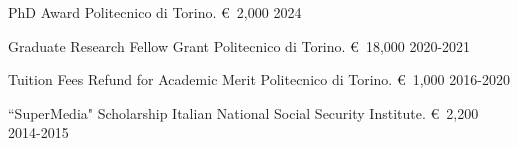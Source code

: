 
\begin{cvhonors}
  \cvhonor
    {PhD Award} %
    {Politecnico di Torino.} %
    {\euro \ 2,000} %
    {2024} %
    
  \cvhonor
    {Graduate Research Fellow Grant} %
    {Politecnico di Torino.} %
    {\euro \ 18,000} %
    {2020-2021} %
  
  \cvhonor
    {Tuition Fees Refund for Academic Merit} %
    {Politecnico di Torino.} %
    {\euro \ 1,000} %
    {2016-2020} %
    
  \cvhonor
    {``SuperMedia" Scholarship} %
    {Italian National Social Security Institute.} %
    {\euro \ 2,200} %
    {2014-2015} %
\end{cvhonors}